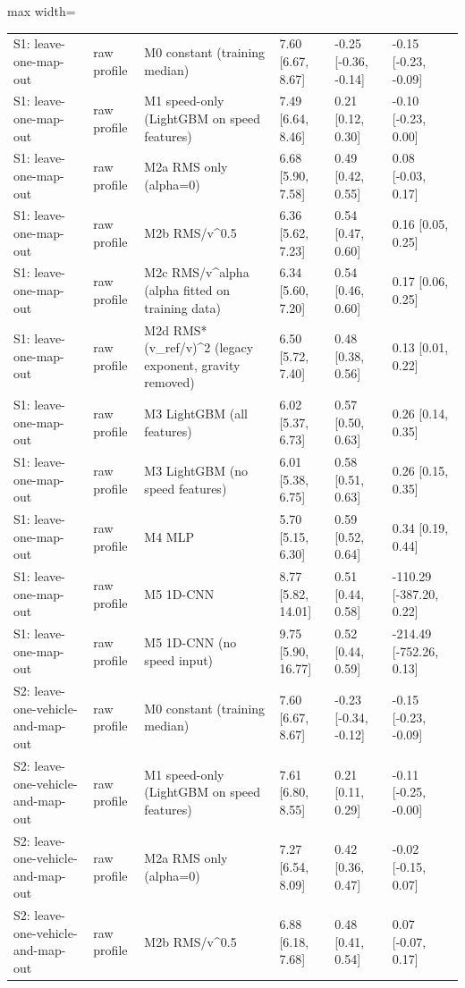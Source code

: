 \begin{table}[!htbp]
\begin{adjustbox}{max width=\columnwidth}
\begin{tabular}{>{\raggedright\arraybackslash}p{3.4cm}l>{\raggedright\arraybackslash}p{4.6cm}lll}
S1: leave-one-map-out & raw profile & M0 constant (training median) & 7.60 [6.67, 8.67] & -0.25 [-0.36, -0.14] & -0.15 [-0.23, -0.09] \\
S1: leave-one-map-out & raw profile & M1 speed-only (LightGBM on speed features) & 7.49 [6.64, 8.46] & 0.21 [0.12, 0.30] & -0.10 [-0.23, 0.00] \\
S1: leave-one-map-out & raw profile & M2a RMS only (alpha=0) & 6.68 [5.90, 7.58] & 0.49 [0.42, 0.55] & 0.08 [-0.03, 0.17] \\
S1: leave-one-map-out & raw profile & M2b RMS/v\textasciicircum{}0.5 & 6.36 [5.62, 7.23] & 0.54 [0.47, 0.60] & 0.16 [0.05, 0.25] \\
S1: leave-one-map-out & raw profile & M2c RMS/v\textasciicircum{}alpha (alpha fitted on training data) & 6.34 [5.60, 7.20] & 0.54 [0.46, 0.60] & 0.17 [0.06, 0.25] \\
S1: leave-one-map-out & raw profile & M2d RMS*(v\_ref/v)\textasciicircum{}2 (legacy exponent, gravity removed) & 6.50 [5.72, 7.40] & 0.48 [0.38, 0.56] & 0.13 [0.01, 0.22] \\
S1: leave-one-map-out & raw profile & M3 LightGBM (all features) & 6.02 [5.37, 6.73] & 0.57 [0.50, 0.63] & 0.26 [0.14, 0.35] \\
S1: leave-one-map-out & raw profile & M3 LightGBM (no speed features) & 6.01 [5.38, 6.75] & 0.58 [0.51, 0.63] & 0.26 [0.15, 0.35] \\
S1: leave-one-map-out & raw profile & M4 MLP & 5.70 [5.15, 6.30] & 0.59 [0.52, 0.64] & 0.34 [0.19, 0.44] \\
S1: leave-one-map-out & raw profile & M5 1D-CNN & 8.77 [5.82, 14.01] & 0.51 [0.44, 0.58] & -110.29 [-387.20, 0.22] \\
S1: leave-one-map-out & raw profile & M5 1D-CNN (no speed input) & 9.75 [5.90, 16.77] & 0.52 [0.44, 0.59] & -214.49 [-752.26, 0.13] \\
S2: leave-one-vehicle-and-map-out & raw profile & M0 constant (training median) & 7.60 [6.67, 8.67] & -0.23 [-0.34, -0.12] & -0.15 [-0.23, -0.09] \\
S2: leave-one-vehicle-and-map-out & raw profile & M1 speed-only (LightGBM on speed features) & 7.61 [6.80, 8.55] & 0.21 [0.11, 0.29] & -0.11 [-0.25, -0.00] \\
S2: leave-one-vehicle-and-map-out & raw profile & M2a RMS only (alpha=0) & 7.27 [6.54, 8.09] & 0.42 [0.36, 0.47] & -0.02 [-0.15, 0.07] \\
S2: leave-one-vehicle-and-map-out & raw profile & M2b RMS/v\textasciicircum{}0.5 & 6.88 [6.18, 7.68] & 0.48 [0.41, 0.54] & 0.07 [-0.07, 0.17] \\

\end{tabular}
\end{adjustbox}
\end{table}
